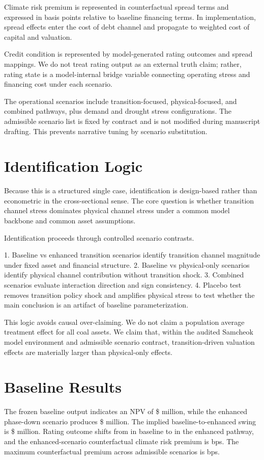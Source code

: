 \documentclass[preprint,12pt]{elsarticle}
\begin{document}
Climate risk premium is represented in counterfactual spread terms and expressed in basis points relative to baseline financing terms. In implementation, spread effects enter the cost of debt channel and propagate to weighted cost of capital and valuation.

Credit condition is represented by model-generated rating outcomes and spread mappings. We do not treat rating output as an external truth claim; rather, rating state is a model-internal bridge variable connecting operating stress and financing cost under each scenario.

The operational scenarios include transition-focused, physical-focused, and combined pathways, plus demand and drought stress configurations. The admissible scenario list is fixed by contract and is not modified during manuscript drafting. This prevents narrative tuning by scenario substitution.

\section{Identification Logic}
Because this is a structured single case, identification is design-based rather than econometric in the cross-sectional sense. The core question is whether transition channel stress dominates physical channel stress under a common model backbone and common asset assumptions.

Identification proceeds through controlled scenario contrasts.

1. Baseline vs enhanced transition scenarios identify transition channel magnitude under fixed asset and financial structure.
2. Baseline vs physical-only scenarios identify physical channel contribution without transition shock.
3. Combined scenarios evaluate interaction direction and sign consistency.
4. Placebo test removes transition policy shock and amplifies physical stress to test whether the main conclusion is an artifact of baseline parameterization.

This logic avoids causal over-claiming. We do not claim a population average treatment effect for all coal assets. We claim that, within the audited Samcheok model environment and admissible scenario contract, transition-driven valuation effects are materially larger than physical-only effects.

\section{Baseline Results}
The frozen baseline output indicates an NPV of \$\BaselineNPV{} million, while the enhanced phase-down scenario produces \$\EnhancedNPV{} million. The implied baseline-to-enhanced swing is \$\NPVSwing{} million. Rating outcome shifts from \BaselineRating{} in baseline to \EnhancedRating{} in the enhanced pathway, and the enhanced-scenario counterfactual climate risk premium is \EnhancedCRP{} bps. The maximum counterfactual premium across admissible scenarios is \MaxCRP{} bps.
\end{document}
